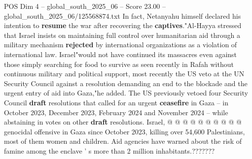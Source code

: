 \begin{textsample}{POS Dim 4 – global\_south\_2025\_06 – Score 23.00 – global\_south\_2025\_06/125568874.txt}
In fact, Netanyahu himself declared his intention to \textbf{resume} the war after recovering the \textbf{captives}."Al-Hayya stressed that Israel insists on maintaining full control over humanitarian aid through a military mechanism \textbf{rejected} by international organizations as a violation of international law.
Israel"would not have continued its massacres even against those simply searching for food to survive as seen recently in Rafah without continuous military and political support, most recently the US veto at the UN Security Council against a resolution demanding an end to the blockade and the urgent entry of aid into Gaza,"he added.
The US previously vetoed four Security Council \textbf{draft} resolutions that called for an urgent \textbf{ceasefire} in Gaza -- in October 2023, December 2023, February 2024 and November 2024 -- while abstaining in votes on other \textbf{draft} resolutions.
Israel, @ @ @ @ @ @ @ @ @ @ genocidal offensive in Gaza since October 2023, killing over 54,600 Palestinians, most of them women and children.
Aid agencies have warned about the risk of famine among the enclave ' s more than 2 million inhabitants.???????

\end{textsample}
